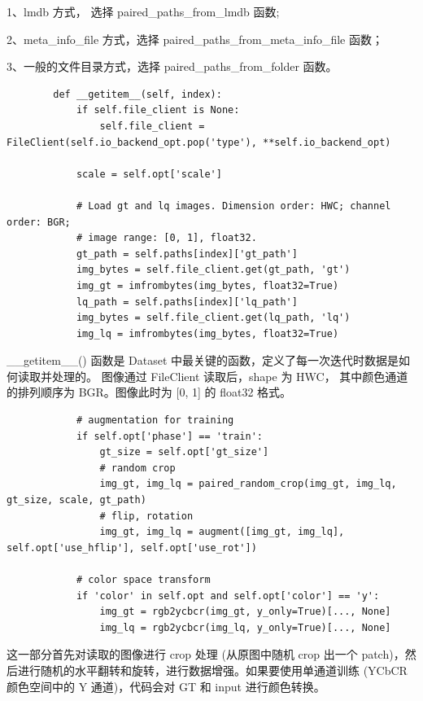 \documentclass[../main.tex]{subfiles}
\begin{document}
    1、lmdb 方式， 选择 paired\_paths\_from\_lmdb 函数;

    2、meta\_info\_file 方式，选择 paired\_paths\_from\_meta\_info\_file 函数；

    3、一般的文件目录方式，选择 paired\_paths\_from\_folder 函数。

    \begin{verbatim}
        def __getitem__(self, index):
            if self.file_client is None:
                self.file_client = FileClient(self.io_backend_opt.pop('type'), **self.io_backend_opt)

            scale = self.opt['scale']

            # Load gt and lq images. Dimension order: HWC; channel order: BGR;
            # image range: [0, 1], float32.
            gt_path = self.paths[index]['gt_path']
            img_bytes = self.file_client.get(gt_path, 'gt')
            img_gt = imfrombytes(img_bytes, float32=True)
            lq_path = self.paths[index]['lq_path']
            img_bytes = self.file_client.get(lq_path, 'lq')
            img_lq = imfrombytes(img_bytes, float32=True)
    \end{verbatim}

    \_\_getitem\_\_() 函数是 Dataset 中最关键的函数，定义了每一次迭代时数据是如何读取并处理的。 图像通过 FileClient 读取后，shape 为 HWC， 其中颜色通道的排列顺序为 BGR。图像此时为 [0, 1] 的 float32 格式。

    \begin{verbatim}
            # augmentation for training
            if self.opt['phase'] == 'train':
                gt_size = self.opt['gt_size']
                # random crop
                img_gt, img_lq = paired_random_crop(img_gt, img_lq, gt_size, scale, gt_path)
                # flip, rotation
                img_gt, img_lq = augment([img_gt, img_lq], self.opt['use_hflip'], self.opt['use_rot'])

            # color space transform
            if 'color' in self.opt and self.opt['color'] == 'y':
                img_gt = rgb2ycbcr(img_gt, y_only=True)[..., None]
                img_lq = rgb2ycbcr(img_lq, y_only=True)[..., None]
    \end{verbatim}

    这一部分首先对读取的图像进行 crop 处理 (从原图中随机 crop 出一个 patch)，然后进行随机的水平翻转和旋转，进行数据增强。如果要使用单通道训练 (YCbCR 颜色空间中的 Y 通道)，代码会对 GT 和 input 进行颜色转换。
\end{document}
